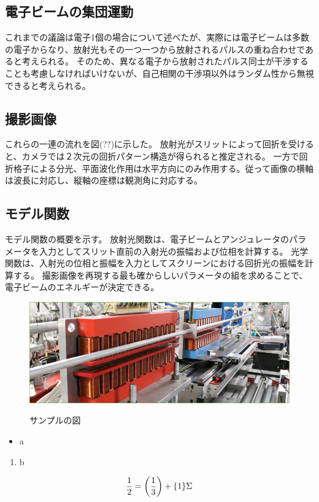 \documentclass[a4paper,11pt,uplatex]{jsbook}
\begin{document}
\subsection{電子ビームの集団運動}
これまでの議論は電子1個の場合について述べたが、実際には電子ビームは多数の電子からなり、放射光もその一つ一つから放射されるパルスの重ね合わせであると考えられる。
そのため、異なる電子から放射されたパルス同士が干渉することも考慮しなければいけないが、自己相関の干渉項以外はランダム性から無視できると考えられる。
\subsection{撮影画像}
これらの一連の流れを図(??)に示した。
放射光がスリットによって回折を受けると、カメラでは２次元の回折パターン構造が得られると推定される。
一方で回折格子による分光、平面波化作用は水平方向にのみ作用する。従って画像の横軸は波長に対応し、縦軸の座標は観測角に対応する。
\subsection{モデル関数}
モデル関数の概要を示す。
放射光関数は、電子ビームとアンジュレータのパラメータを入力としてスリット直前の入射光の振幅および位相を計算する。
光学関数は、入射光の位相と振幅を入力としてスクリーンにおける回折光の振幅を計算する。
撮影画像を再現する最も確からしいパラメータの組を求めることで、電子ビームのエネルギーが決定できる。


\clearpage

\begin{figure}[tb]
  \centering
  \includegraphics[width=0.8\linewidth]{image/1-1.jpg}\\
  \caption{サンプルの図}
  \label{sample_image}
\end{figure}

\begin{itemize}
  \item a
\end{itemize}
\begin{enumerate}
  \item b
\end{enumerate}

\begin{align}
\frac{1}{2} = \qty(\frac{1}{3}) + \qty{1}\Sigma
\end{align}
\end{document}
